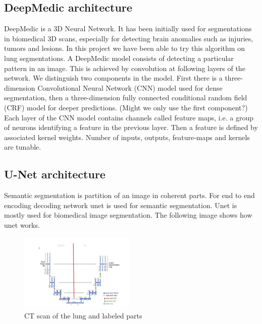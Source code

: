 \subsection{DeepMedic architecture}
DeepMedic is a 3D Neural Network. It has been initially used for segmentations in biomedical 3D scans, especially for detecting brain anomalies such as injuries, tumors and lesions. In this project we have been able to try this algorithm on lung segmentations. \newline 
A DeepMedic model consists of detecting a particular pattern in an image. This is achieved by convolution  at  following layers of the network. We distinguish two components in the model. First there is a three-dimension Convolutional Neural Network (CNN) model used for dense segmentation, then  a three-dimension fully connected conditional random field (CRF) model for deeper predictions. (Might we only use the first component?) \newline
Each layer of the CNN model contains channels called feature maps, i.e. a group of neurons identifying a feature in the previous layer. Then a feature is defined by associated kernel weights. Number of inputs, outputs, feature-maps and kernels are tunable.

\subsection{U-Net architecture}
Semantic segmentation is partition of an image in coherent parts. For end to end encoding decoding network unet is used for semantic segmentation. Unet is mostly used for biomedical image segmentation. The following image shows how unet works.\newline

\begin{figure}[h!]
	\includegraphics[width=0.49\textwidth, angle=0]{files/unetstructure.jpg}
	\caption{CT scan of the lung and labeled parts}
	\label{unetstructure}
\end{figure}

